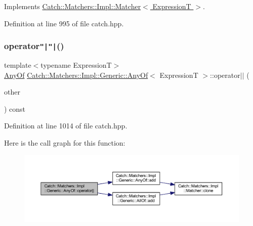 Implements \hyperlink{struct_catch_1_1_matchers_1_1_impl_1_1_matcher_a8c1c5511ce1f3738a45e6901b558f583}{Catch\+::\+Matchers\+::\+Impl\+::\+Matcher$<$ Expression\+T $>$}.



Definition at line 995 of file catch.\+hpp.

\hypertarget{class_catch_1_1_matchers_1_1_impl_1_1_generic_1_1_any_of_a6dc9aee9a816f66ddc9de0c45c1c9ac1}{}\label{class_catch_1_1_matchers_1_1_impl_1_1_generic_1_1_any_of_a6dc9aee9a816f66ddc9de0c45c1c9ac1} 
\subsubsection{\texorpdfstring{operator\texttt{"|}\texttt{"|}()}{operator||()}}
{\footnotesize\ttfamily template$<$typename ExpressionT$>$ \\
\hyperlink{class_catch_1_1_matchers_1_1_impl_1_1_generic_1_1_any_of}{Any\+Of} \hyperlink{class_catch_1_1_matchers_1_1_impl_1_1_generic_1_1_any_of}{Catch\+::\+Matchers\+::\+Impl\+::\+Generic\+::\+Any\+Of}$<$ ExpressionT $>$\+::operator$\vert$$\vert$ (\begin{DoxyParamCaption}\item[{\hyperlink{struct_catch_1_1_matchers_1_1_impl_1_1_matcher}{Matcher}$<$ ExpressionT $>$ const \&}]{other }\end{DoxyParamCaption}) const\hspace{0.3cm}{\ttfamily [inline]}}



Definition at line 1014 of file catch.\+hpp.

Here is the call graph for this function\+:\nopagebreak
\begin{figure}[H]
\begin{center}
\leavevmode
\includegraphics[width=350pt]{class_catch_1_1_matchers_1_1_impl_1_1_generic_1_1_any_of_a6dc9aee9a816f66ddc9de0c45c1c9ac1_cgraph}
\end{center}
\end{figure}
\hypertarget{class_catch_1_1_matchers_1_1_impl_1_1_generic_1_1_any_of_a331aaf012b133682eadc9ed5342f848a}{}\label{class_catch_1_1_matchers_1_1_impl_1_1_generic_1_1_any_of_a331aaf012b133682eadc9ed5342f848a} 

